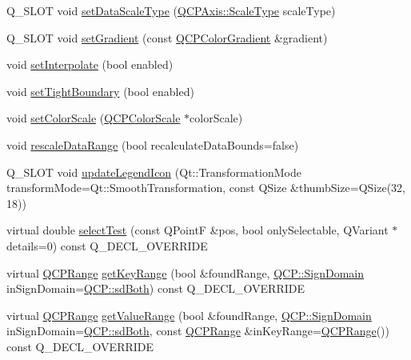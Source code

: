 \begin{DoxyCompactItemize}
\item 
Q\+\_\+\+S\+L\+OT void \hyperlink{classQCPColorMap_a9d20aa08e3c1f20f22908c45b9c06511}{set\+Data\+Scale\+Type} (\hyperlink{classQCPAxis_a36d8e8658dbaa179bf2aeb973db2d6f0}{Q\+C\+P\+Axis\+::\+Scale\+Type} scale\+Type)
\item 
Q\+\_\+\+S\+L\+OT void \hyperlink{classQCPColorMap_a7313c78360471cead3576341a2c50377}{set\+Gradient} (const \hyperlink{classQCPColorGradient}{Q\+C\+P\+Color\+Gradient} \&gradient)
\item 
void \hyperlink{classQCPColorMap_a484eaa8a5065cfc386b15375bf98b964}{set\+Interpolate} (bool enabled)
\item 
void \hyperlink{classQCPColorMap_ad03221cc285e5f562a0b13d684b5576d}{set\+Tight\+Boundary} (bool enabled)
\item 
void \hyperlink{classQCPColorMap_aa828921db364fe3c6af4619580ab85fd}{set\+Color\+Scale} (\hyperlink{classQCPColorScale}{Q\+C\+P\+Color\+Scale} $\ast$color\+Scale)
\item 
void \hyperlink{classQCPColorMap_a856608fa3dd1cc290bcd5f29a5575774}{rescale\+Data\+Range} (bool recalculate\+Data\+Bounds=false)
\item 
Q\+\_\+\+S\+L\+OT void \hyperlink{classQCPColorMap_a5d8158b62d55fcfeaabcb68ce0083e87}{update\+Legend\+Icon} (Qt\+::\+Transformation\+Mode transform\+Mode=Qt\+::\+Smooth\+Transformation, const Q\+Size \&thumb\+Size=Q\+Size(32, 18))
\item 
virtual double \hyperlink{classQCPColorMap_afb4b843596addf58096082827a9e3450}{select\+Test} (const Q\+PointF \&pos, bool only\+Selectable, Q\+Variant $\ast$details=0) const Q\+\_\+\+D\+E\+C\+L\+\_\+\+O\+V\+E\+R\+R\+I\+DE
\item 
virtual \hyperlink{classQCPRange}{Q\+C\+P\+Range} \hyperlink{classQCPColorMap_a985861974560f950af6cb7fae8c46267}{get\+Key\+Range} (bool \&found\+Range, \hyperlink{namespaceQCP_afd50e7cf431af385614987d8553ff8a9}{Q\+C\+P\+::\+Sign\+Domain} in\+Sign\+Domain=\hyperlink{namespaceQCP_afd50e7cf431af385614987d8553ff8a9aa38352ef02d51ddfa4399d9551566e24}{Q\+C\+P\+::sd\+Both}) const Q\+\_\+\+D\+E\+C\+L\+\_\+\+O\+V\+E\+R\+R\+I\+DE
\item 
virtual \hyperlink{classQCPRange}{Q\+C\+P\+Range} \hyperlink{classQCPColorMap_a88134493aaf6b297af34eaab65264fff}{get\+Value\+Range} (bool \&found\+Range, \hyperlink{namespaceQCP_afd50e7cf431af385614987d8553ff8a9}{Q\+C\+P\+::\+Sign\+Domain} in\+Sign\+Domain=\hyperlink{namespaceQCP_afd50e7cf431af385614987d8553ff8a9aa38352ef02d51ddfa4399d9551566e24}{Q\+C\+P\+::sd\+Both}, const \hyperlink{classQCPRange}{Q\+C\+P\+Range} \&in\+Key\+Range=\hyperlink{classQCPRange}{Q\+C\+P\+Range}()) const Q\+\_\+\+D\+E\+C\+L\+\_\+\+O\+V\+E\+R\+R\+I\+DE
\end{DoxyCompactItemize}
